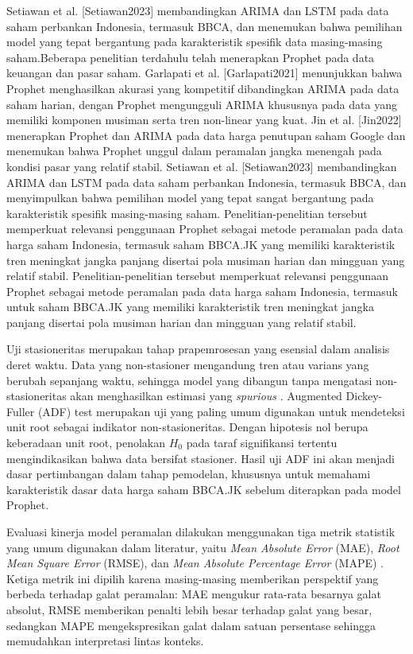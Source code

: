 \documentclass[11pt,twoside]{article}
\begin{document}
Setiawan et al. [Setiawan2023] membandingkan ARIMA dan LSTM pada data saham perbankan Indonesia, termasuk BBCA, dan menemukan bahwa pemilihan model yang tepat bergantung pada karakteristik spesifik data masing-masing saham.Beberapa penelitian terdahulu telah menerapkan Prophet pada data keuangan dan pasar saham. Garlapati et al. [Garlapati2021] menunjukkan bahwa Prophet menghasilkan akurasi yang kompetitif dibandingkan ARIMA pada data saham harian, dengan Prophet mengungguli ARIMA khususnya pada data yang memiliki komponen musiman serta tren non-linear yang kuat. Jin et al. [Jin2022] menerapkan Prophet dan ARIMA pada data harga penutupan saham Google dan menemukan bahwa Prophet unggul dalam peramalan jangka menengah pada kondisi pasar yang relatif stabil. Setiawan et al. [Setiawan2023] membandingkan ARIMA dan LSTM pada data saham perbankan Indonesia, termasuk BBCA, dan menyimpulkan bahwa pemilihan model yang tepat sangat bergantung pada karakteristik spesifik masing-masing saham. Penelitian-penelitian tersebut memperkuat relevansi penggunaan Prophet sebagai metode peramalan pada data harga saham Indonesia, termasuk saham BBCA.JK yang memiliki karakteristik tren meningkat jangka panjang disertai pola musiman harian dan mingguan yang relatif stabil. Penelitian-penelitian tersebut
memperkuat relevansi penggunaan Prophet sebagai metode peramalan pada data harga saham
Indonesia, termasuk untuk saham BBCA.JK yang memiliki karakteristik tren meningkat jangka
panjang disertai pola musiman harian dan mingguan yang relatif stabil.

Uji stasioneritas merupakan tahap prapemrosesan yang esensial dalam analisis deret waktu.
Data yang non-stasioner mengandung tren atau varians yang berubah sepanjang waktu, sehingga
model yang dibangun tanpa mengatasi non-stasioneritas akan menghasilkan estimasi yang \textit{spurious}
\cite{Granger1974}. Augmented Dickey-Fuller (ADF) test \cite{Dickey1979} merupakan uji yang paling umum digunakan
untuk mendeteksi unit root sebagai indikator non-stasioneritas. Dengan hipotesis nol berupa
keberadaan unit root, penolakan $H_0$ pada taraf signifikansi tertentu mengindikasikan bahwa data
bersifat stasioner. Hasil uji ADF ini akan menjadi dasar pertimbangan dalam tahap pemodelan,
khususnya untuk memahami karakteristik dasar data harga saham BBCA.JK sebelum diterapkan
pada model Prophet.

Evaluasi kinerja model peramalan dilakukan menggunakan tiga metrik statistik yang umum
digunakan dalam literatur, yaitu \textit{Mean Absolute Error} (MAE), \textit{Root Mean Square Error}
(RMSE), dan \textit{Mean Absolute Percentage Error} (MAPE) \cite{Hyndman2006}. Ketiga metrik ini dipilih
karena masing-masing memberikan perspektif yang berbeda terhadap galat peramalan: MAE
mengukur rata-rata besarnya galat absolut, RMSE memberikan penalti lebih besar terhadap galat
yang besar, sedangkan MAPE mengekspresikan galat dalam satuan persentase sehingga memudahkan
interpretasi lintas konteks.
\end{document}

